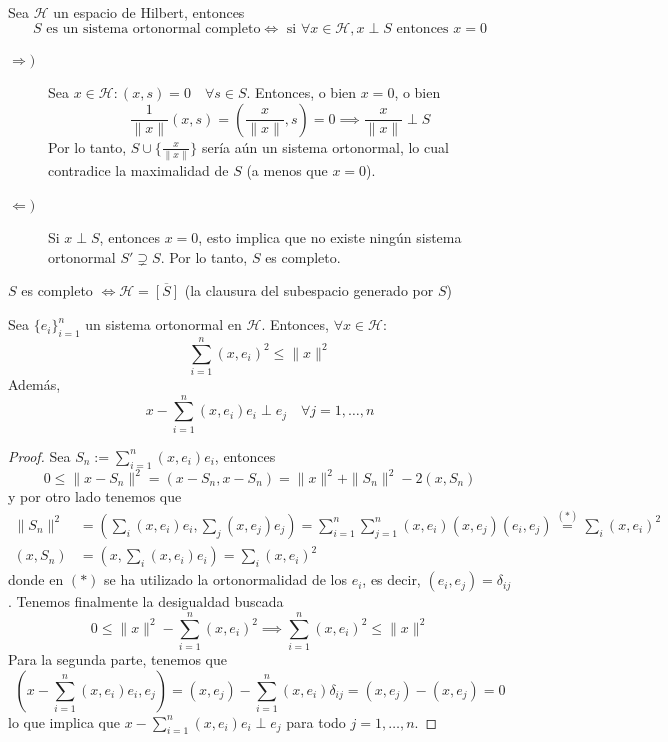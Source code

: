 \begin{ejercicio}
    Sea $\mathcal{H}$ un espacio de Hilbert, entonces 
    \begin{equation*}
        S \text{ es un sistema ortonormal completo} \iff \text{ si } \forall x \in \mathcal{H}, x \perp S \text{ entonces } x = 0
    \end{equation*}
    \begin{description}
        \item[$\Longrightarrow)$] Sea $x \in \mathcal{H} : (x, s) = 0 \quad \forall s \in S$. Entonces, o bien $x=0$, o bien 
        $$\frac{1}{\|x\|}(x, s) = \left(\frac{x}{\|x\|}, s\right) = 0 \implies \frac{x}{\|x\|} \perp S$$
        Por lo tanto, $S \cup \{ \frac{x}{\|x\|} \}$ sería aún un sistema ortonormal, lo cual contradice la maximalidad de $S$ (a menos que $x=0$).
        \item[$\Longleftarrow)$] Si $x \perp S$, entonces $x = 0$, esto implica que no existe ningún sistema ortonormal $S' \supsetneq S$. Por lo tanto, $S$ es completo.
    \end{description}
\end{ejercicio}

\begin{ejercicio}
    $S$ es completo $\iff \mathcal{H} = \overline{[S]}$ (la clausura del subespacio generado por $S$)
\end{ejercicio}

\begin{prop}
    Sea $\{e_i\}_{i=1}^{n}$ un sistema ortonormal en $\mathcal{H}$. Entonces, $\forall x \in \mathcal{H}$:
    \[ \sum_{i=1}^{n} (x, e_i)^2 \le \|x\|^2 \]
    Además, 
    $$x - \sum_{i=1}^{n} (x, e_i)e_i \perp e_j \quad \forall j=1, \dots, n$$
\begin{proof}
    Sea $S_n := \sum\limits_{i=1}^{n} (x, e_i)e_i$, entonces 
    $$0 \le \|x - S_n\|^2 =(x-S_n, x-S_n)= \|x\|^2 + \|S_n\|^2 - 2(x, S_n)$$
    y por otro lado tenemos que 
    \begin{align*}
        \|S_n\|^2 &= \left( \sum_i (x, e_i)e_i, \sum_j (x, e_j)e_j \right) = \sum_{i=1}^n \sum_{j=1}^n (x, e_i) (x, e_j) (e_i, e_j)\overset{(*)}{=} \sum_i (x, e_i)^2 \\
        (x, S_n) &= \left( x, \sum_i (x, e_i)e_i \right) = \sum_i (x, e_i)^2
    \end{align*}
    donde en $(*)$ se ha utilizado la ortonormalidad de los $e_i$, es decir, $(e_i, e_j) = \delta_{ij}$. Tenemos finalmente la desigualdad buscada
    \begin{equation*}
        0 \le \|x\|^2 - \sum_{i=1}^{n} (x, e_i)^2 \implies \sum_{i=1}^{n} (x, e_i)^2 \le \|x\|^2
    \end{equation*}
    Para la segunda parte, tenemos que
    \begin{equation*}
        \left( x - \sum_{i=1}^{n} (x, e_i)e_i, e_j \right) = (x, e_j) - \sum_{i=1}^{n} (x, e_i) \delta_{ij} = (x, e_j) - (x, e_j) = 0
    \end{equation*}
    lo que implica que $x - \sum\limits_{i=1}^{n} (x, e_i)e_i \perp e_j$ para todo $j=1, \dots, n$.
\end{proof}
\end{prop}

